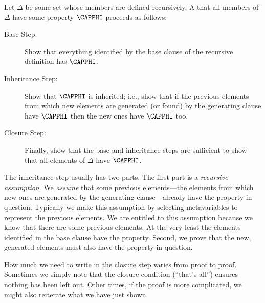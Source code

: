 \begin{majorILnc}{}
	Let $\Delta$ be some set whose members are defined recursively. A  that all members of $\Delta$ have some property $\CAPPHI$ proceeds as follows:
	\begin{description}
		\item[Base Step:] Show that everything identified by the base clause of the recursive definition has $\CAPPHI$.  
		\item[Inheritance Step:] Show that $\CAPPHI$ is inherited; i.e., show that if the previous elements from which new elements are generated (or found) by the generating clause have $\CAPPHI$ then the new ones have $\CAPPHI$ too.
		\item[Closure Step:] Finally, show that the base and inheritance steps are sufficient to show that all elements of $\Delta$ have $\CAPPHI$. 
		
	\end{description}
\end{majorILnc}
The inheritance step usually has two parts. The first part is a \emph{recursive assumption}.
We \emph{assume} that some previous elements---the elements from which new ones are generated by the generating clause---already have the property in question.
Typically we make this assumption by selecting metavariables to represent the previous elements.
We are entitled to this assumption because we know that there are some previous elements.
At the very least the elements identified in the base clause have the property.
Second, we prove that the new, generated elements must also have the property in question.

How much we need to write in the closure step varies from proof to proof. 
Sometimes we simply note that the closure condition (``that's all'') ensures nothing has been left out. 
Other times, if the proof is more complicated, we might also reiterate what we have just shown. 

